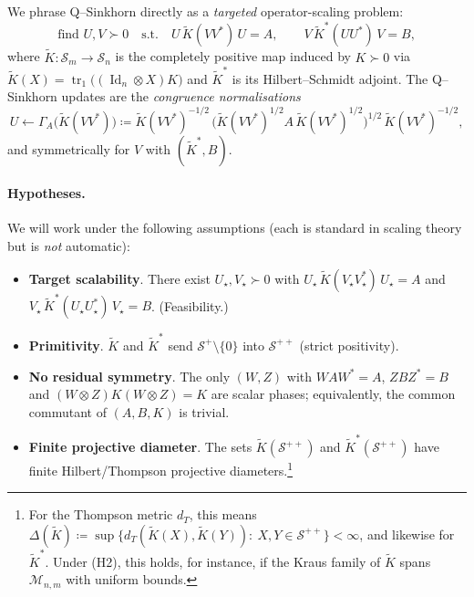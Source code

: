\documentclass[10pt]{article}
\newcommand{\Ss}{\mathcal{S}}
\newcommand{\Mm}{\mathcal{M}}
\newcommand{\Id}{\operatorname{Id}}
\newcommand{\tr}{\operatorname{tr}}
\newcommand{\eqdef}{\coloneqq}
\newcommand{\Ko}{\widetilde{K}}
\theoremstyle{plain}
\theoremstyle{definition}
\theoremstyle{remark}
\begin{document}
We phrase Q--Sinkhorn directly as a \emph{targeted} operator-scaling problem:
\[
\text{find }U,V\succ0\quad\text{s.t.}\quad
U\,\Ko(VV^\ast)\,U=A,\qquad
V\,\Ko^\ast(UU^\ast)\,V=B,
\]
where $\Ko:\Ss_m\to\Ss_n$ is the completely positive map induced by $K\succ0$ via
$\Ko(X)=\tr_1\big((\Id_n\otimes X)K\big)$ and $\Ko^\ast$ is its Hilbert--Schmidt adjoint.  
The Q--Sinkhorn updates are the \emph{congruence normalisations}
\begin{equation}\label{eq:updates-target}
U \leftarrow \Gamma_A\!\big(\Ko(VV^\ast)\big)\eqdef \Ko(VV^\ast)^{-1/2}\,\big(\Ko(VV^\ast)^{1/2}A\,\Ko(VV^\ast)^{1/2}\big)^{1/2}\,\Ko(VV^\ast)^{-1/2},
\end{equation}
and symmetrically for $V$ with $(\Ko^\ast, B)$.

\paragraph{Hypotheses.}
We will work under the following assumptions (each is standard in scaling theory but is \emph{not} automatic):
\begin{itemize}
\item[(H1)]  \textbf{Target scalability}. There exist $U_\star,V_\star\succ0$ with
$U_\star\,\Ko(V_\star V_\star^\ast)\,U_\star=A$ and $V_\star\,\Ko^\ast(U_\star U_\star^\ast)\,V_\star=B$.
(Feasibility.)
\item[(H2) ]  \textbf{Primitivity}. $\Ko$ and $\Ko^\ast$ send $\Ss^{+}\setminus\{0\}$ into $\Ss^{++}$
(strict positivity).
\item[(H3)]  \textbf{No residual symmetry}. The only $(W,Z)$ with $WAW^\ast=A$, $ZBZ^\ast=B$ and
$(W\otimes Z)K(W\otimes Z)=K$ are scalar phases; equivalently, the common commutant of $(A,B,K)$ is trivial.
\item[(H4)]  \textbf{Finite projective diameter}. The sets $\Ko(\Ss^{++})$ and $\Ko^\ast(\Ss^{++})$ have finite Hilbert/Thompson projective diameters.\footnote{For the Thompson metric $d_T$, this means
$\Delta(\Ko)\eqdef\sup\{d_T(\Ko(X),\Ko(Y)):\ X,Y\in\Ss^{++}\}<\infty$, and likewise for $\Ko^\ast$. Under (H2), this holds, for instance, if the Kraus family of $\Ko$ spans $\Mm_{n,m}$ with uniform bounds.}
\end{itemize}
\end{document}
